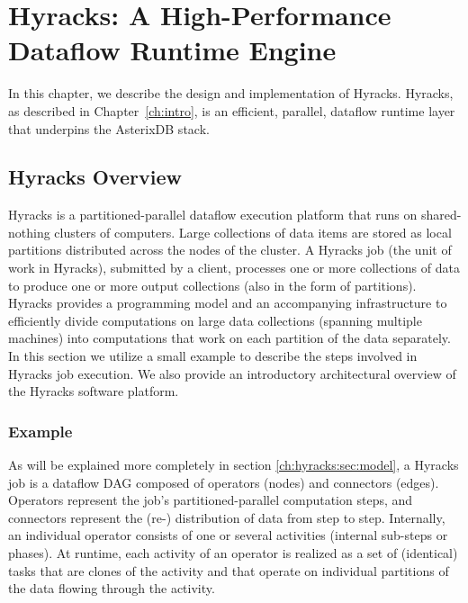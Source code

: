 \chapter{Hyracks: A High-Performance Dataflow Runtime Engine}
\label{ch:hyracks}

In this chapter, we describe the design and implementation of Hyracks. Hyracks, as described in Chapter~\ref{ch:intro}, is an efficient, parallel, dataflow runtime layer that underpins the AsterixDB stack.

\section{Hyracks Overview}
\label{ch:hyracks:sec:overview}

Hyracks is a partitioned-parallel dataflow execution platform that runs on shared-nothing clusters of computers.
Large collections of data items are stored as local partitions distributed across the nodes of the cluster.
A Hyracks job (the unit of work in Hyracks), submitted by a client, processes one or more collections of data to produce
one or more output collections (also in the form of partitions).
Hyracks provides a programming model and an accompanying infrastructure to efficiently divide computations on large data
collections (spanning multiple machines) into computations that work on each partition of the data separately.
In this section we utilize a small example to describe the steps involved in Hyracks job execution.
We also provide an introductory architectural overview of the Hyracks software platform.

\subsection{Example}
\label{ch:hyracks:sec:overview:subsec:example}

As will be explained more completely in section \ref{ch:hyracks:sec:model}, a Hyracks job is a dataflow DAG composed of operators (nodes) and connectors (edges).
Operators represent the job's partitioned-parallel computation steps, and connectors represent the (re-) distribution of data from step to step.
Internally, an individual operator consists of one or several activities (internal sub-steps or phases).
At runtime, each activity of an operator is realized as a set of (identical) tasks that are clones of the activity and that operate on individual
partitions of the data flowing through the activity.

